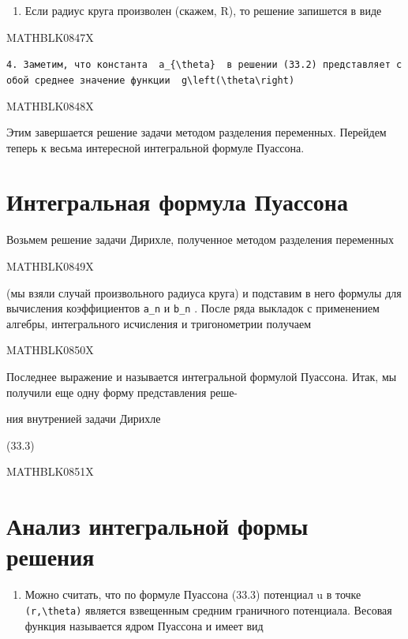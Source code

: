 \documentclass[
  ukrainian,
]{article}
\providecommand{\tightlist}{%
  \setlength{\itemsep}{0pt}\setlength{\parskip}{0pt}}
\begin{document}
\begin{enumerate}
\def\labelenumi{\arabic{enumi}.}
\setcounter{enumi}{2}
\tightlist
\item
  Если радиус круга произволен (скажем, R), то решение запишется в виде
\end{enumerate}

MATHBLK0847X

\texttt{4.\ Заметим,\ что\ константа\ \ \textquotesingle{}a\_\{\textbackslash{}theta\}\textquotesingle{}\ \ в\ решении\ (33.2)\ представляет\ собой\ среднее\ значение\ функции\ \ \textquotesingle{}g\textbackslash{}left(\textbackslash{}theta\textbackslash{}right)\textquotesingle{}}

MATHBLK0848X

Этим завершается решение задачи методом разделения переменных. Перейдем
теперь к весьма интересной интегральной формуле Пуассона.

\section{Интегральная формула
Пуассона}\label{ux438ux43dux442ux435ux433ux440ux430ux43bux44cux43dux430ux44f-ux444ux43eux440ux43cux443ux43bux430-ux43fux443ux430ux441ux441ux43eux43dux430}

Возьмем решение задачи Дирихле, полученное методом разделения переменных

MATHBLK0849X

(мы взяли случай произвольного радиуса круга) и подставим в него формулы
для вычисления коэффициентов \texttt{a\_n} и \texttt{b\_n} . После ряда
выкладок с применением алгебры, интегрального исчисления и тригонометрии
получаем

MATHBLK0850X

Последнее выражение и называется интегральной формулой Пуассона. Итак,
мы получили еще одну форму представления реше-

ния внутренией задачи Дирихле

(33.3)

MATHBLK0851X

\section{Анализ интегральной формы
решения}\label{ux430ux43dux430ux43bux438ux437-ux438ux43dux442ux435ux433ux440ux430ux43bux44cux43dux43eux439-ux444ux43eux440ux43cux44b-ux440ux435ux448ux435ux43dux438ux44f}

\begin{enumerate}
\def\labelenumi{\arabic{enumi}.}
\tightlist
\item
  Можно считать, что по формуле Пуассона (33.3) потенциал u в точке
  \texttt{(r,\textbackslash{}theta)} является взвещенным средним
  граничного потенциала. Весовая функция называется ядром Пуассона и
  имеет вид
\end{enumerate}
\end{document}
